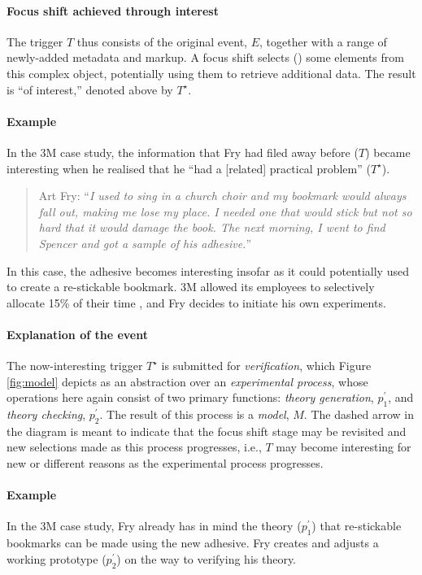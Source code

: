 \paragraph{Focus shift achieved through interest}
The trigger $T$ thus consists of the original event, $E$, together
with a range of newly-added metadata and markup.  A focus shift
selects ({\bf \guillemotleft}) some elements from this complex object,
potentially using them to retrieve additional data.  The result is
``of interest,'' denoted above by $T^{\star}$.

\paragraph{\textbf{\upshape Example}}
In the 3M case study, the information that Fry had filed away
before ($T$) became interesting when he realised that he ``had a
[related] practical problem'' ($T^{\star}$).

\begin{quote}
Art Fry: ``\emph{I used to sing in a church choir and my bookmark
  would always fall out, making me lose my place.  I needed one that
  would stick but not so hard that it would damage the book.  The next
  morning, I went to find Spencer and got a sample of his adhesive.}''
\end{quote}
In this case, the adhesive becomes interesting insofar as it could
potentially used to create a re-stickable bookmark.  3M allowed its
employees to selectively allocate 15\% of their time
\cite{tce-postits}, and Fry decides to initiate his own experiments.

\paragraph{Explanation of the event}
The now-interesting trigger $T^{\star}$ is submitted for
\emph{verification}, which Figure \ref{fig:model} depicts as an
abstraction over an \emph{experimental process}, whose operations here
again consist of two primary functions: \emph{theory generation},
$p^{\prime}_1$, and \emph{theory checking}, $p^{\prime}_2$.  The
result of this process is a \emph{model}, $M$.  The dashed arrow in
the diagram is meant to indicate that the focus shift stage may be
revisited and new selections made as this process progresses, i.e.,
$T$ may become interesting for new or different reasons as the
experimental process progresses.

\paragraph{\textbf{\upshape Example}}
In the 3M case study, Fry already has in mind the theory
($p_1^\prime$) that re-stickable bookmarks can be made using the new
adhesive.  Fry creates and adjusts a working prototype  ($p_2^\prime$)
on the way to verifying his theory.

